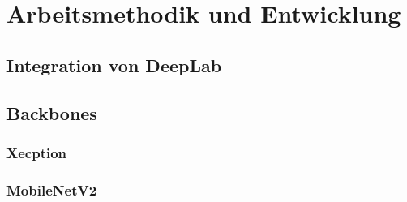 \chapter{Arbeitsmethodik und Entwicklung}
	\section{Integration von DeepLab}
	\section{Backbones}
		\subsection{Xecption}
		\subsection{MobileNetV2}